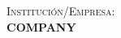 
\newcommand{\trabajo}[1]{
\cleardoublepage
\vspace*{10cm}
\textsc{Institución/Empresa}:\\[5pt]
\uppercase{\textbf{#1}}\\
\cleardoublepage
}

\trabajo{Company}


